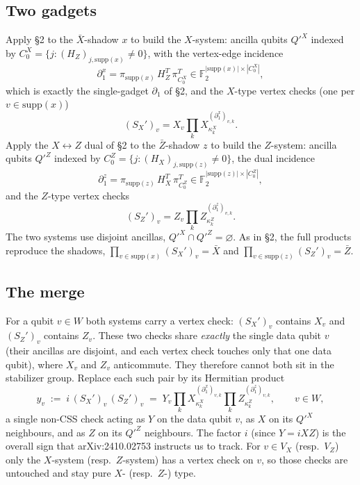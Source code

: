 \documentclass[a4paper, 12pt]{article}
\begin{document}
\subsection{Two gadgets}
Apply \S 2 to the $\bar X$-shadow $x$ to build the $X$-system: ancilla qubits $Q'^X$ indexed by
$C_0^X = \{j : (H_Z)_{j, \mathrm{supp}(x)} \neq 0\}$, with the vertex-edge incidence
\begin{equation}
\partial_1^{x} = \pi_{\mathrm{supp}(x)}\, H_Z^T\, \pi_{C_0^X}^T
\in \mathbb{F}_2^{|\mathrm{supp}(x)| \times |C_0^X|},
\end{equation}
which is exactly the single-gadget $\partial_1$ of \S 2, and the $X$-type vertex checks (one per
$v \in \mathrm{supp}(x)$)
\begin{equation}
(S_X')_v = X_v \prod_{k} X_{\kappa^X_k}^{(\partial_1^{x})_{v,k}} .
\end{equation}
Apply the $X\leftrightarrow Z$ dual of \S 2 to the $\bar Z$-shadow $z$ to build the $Z$-system:
ancilla qubits $Q'^Z$ indexed by $C_0^Z = \{j : (H_X)_{j, \mathrm{supp}(z)} \neq 0\}$, the dual
incidence
\begin{equation}
\partial_1^{z} = \pi_{\mathrm{supp}(z)}\, H_X^T\, \pi_{C_0^Z}^T
\in \mathbb{F}_2^{|\mathrm{supp}(z)| \times |C_0^Z|},
\end{equation}
and the $Z$-type vertex checks
\begin{equation}
(S_Z')_v = Z_v \prod_{k} Z_{\kappa^Z_k}^{(\partial_1^{z})_{v,k}} .
\end{equation}
The two systems use disjoint ancillas, $Q'^X \cap Q'^Z = \varnothing$. As in \S 2, the full
products reproduce the shadows, $\prod_{v\in\mathrm{supp}(x)} (S_X')_v = \bar X$ and
$\prod_{v\in\mathrm{supp}(z)} (S_Z')_v = \bar Z$.

\subsection{The merge}
For a qubit $v \in W$ both systems carry a vertex check: $(S_X')_v$ contains $X_v$ and
$(S_Z')_v$ contains $Z_v$. These two checks share \emph{exactly} the single data qubit $v$
(their ancillas are disjoint, and each vertex check touches only that one data qubit), where
$X_v$ and $Z_v$ anticommute. They therefore cannot both sit in the stabilizer group. Replace
each such pair by its Hermitian product
\begin{equation}
y_v \;:=\; i\,(S_X')_v\,(S_Z')_v
\;=\; Y_v \prod_k X_{\kappa^X_k}^{(\partial_1^{x})_{v,k}}
            \prod_k Z_{\kappa^Z_k}^{(\partial_1^{z})_{v,k}},
\qquad v \in W,
\end{equation}
a single non-CSS check acting as $Y$ on the data qubit $v$, as $X$ on its $Q'^X$ neighbours,
and as $Z$ on its $Q'^Z$ neighbours. The factor $i$ (since $Y = iXZ$) is the overall sign that
arXiv:2410.02753 instructs us to track. For $v \in V_X$ (resp.\ $V_Z$) only the $X$-system
(resp.\ $Z$-system) has a vertex check on $v$, so those checks are untouched and stay pure
$X$- (resp.\ $Z$-) type.
\end{document}

